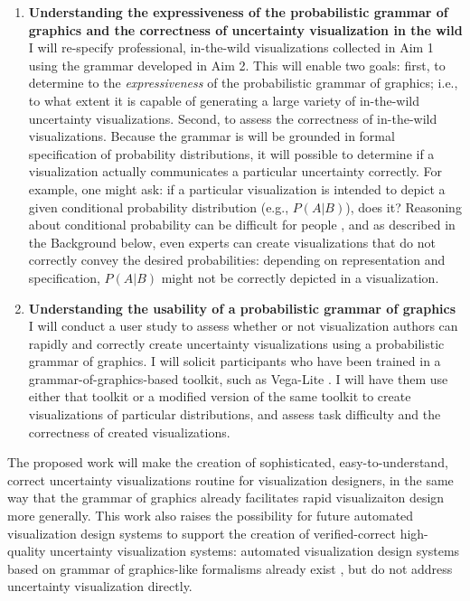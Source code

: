 \documentclass[11pt]{article}
\begin{document}
\begin{enumerate}[noitemsep]
  \item \textbf{Understanding the expressiveness of the probabilistic grammar of graphics and the correctness of uncertainty visualization in the wild} I will re-specify professional, in-the-wild visualizations collected in Aim 1 using the grammar developed in Aim 2. This will enable two goals: first, to determine to the \emph{expressiveness} of the probabilistic grammar of graphics; i.e., to what extent it is capable of generating a large variety of in-the-wild uncertainty visualizations. Second, to assess the correctness of in-the-wild visualizations. Because the grammar is will be grounded in formal specification of probability distributions, it will possible to determine if a visualization actually communicates a particular uncertainty correctly. For example, one might ask: if a particular visualization is intended to depict a given conditional probability distribution (e.g., $P(A|B)$), does it? Reasoning about conditional probability can be difficult for people \cite{Gigerenzer1995}, and as described in the Background below, even experts can create visualizations that do not correctly convey the desired probabilities: depending on representation and specification, $P(A|B)$ might not be correctly depicted in a visualization. 
  \item \textbf{Understanding the usability of a probabilistic grammar of graphics} I will conduct a user study to assess whether or not visualization authors can rapidly and correctly create uncertainty visualizations using a probabilistic grammar of graphics. I will solicit participants who have been trained in a grammar-of-graphics-based toolkit, such as Vega-Lite \cite{Satyanarayan2017vegalite}. I will have them use either that toolkit or a modified version of the same toolkit to create visualizations of particular distributions, and assess task difficulty and the correctness of created visualizations.
\end{enumerate}

The proposed work will make the creation of sophisticated, easy-to-understand, correct uncertainty visualizations routine for visualization designers, in the same way that the grammar of graphics already facilitates rapid visualizaiton design more generally. This work also raises the possibility for future automated visualization design systems to support the creation of verified-correct high-quality uncertainty visualization systems: automated visualization design systems based on grammar of graphics-like formalisms already exist \cite{mackinlay1986automating, moritz2018formalizing}, but do not address uncertainty visualization directly.
\end{document}
